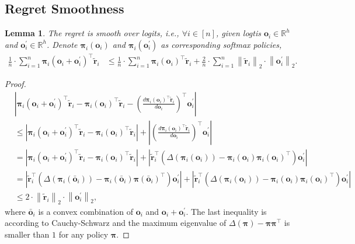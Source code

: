 \documentclass[10pt]{article}
\def\rvo{{\mathbf{o}}}
\def\rvo{{\mathbf{o}}}
\def\rvtilder{{\tilde{\mathbf{r}}}}
\newtheorem{lem}{Lemma}
\def\rvpi{{\boldsymbol{\pi}}}
\def\sR{{\mathbb{R}}}
\begin{document}
\subsection{Regret Smoothness}

\begin{lem}
    The regret is smooth over logits, i.e., $\forall i \in [n]$, given logtis $\rvo_i \in \sR^h$ and $\rvo_i^\prime \in \sR^h$. Denote $\rvpi_i(\rvo_i)$ and $\rvpi_i(\rvo_i^\prime)$ as corresponding softmax policies,
\begin{equation*}
\begin{split}
    \frac{1}{n} \cdot \sum\limits_{i=1}^{n}{  \rvpi_i(\rvo_i + \rvo_i^\prime)^\top \rvtilder_i } &\le \frac{1}{n} \cdot \sum\limits_{i=1}^{n}{ \rvpi_i(\rvo_i)^\top \rvtilder_i } + \frac{2}{n} \cdot \sum\limits_{i=1}^{n}{ \left\| \rvtilder_i \right\|_2 \cdot \left\| \rvo_i^\prime \right\|_2 }.
\end{split}
\end{equation*}
\end{lem}
\begin{proof}
\begin{equation*}
\begin{split}
    &\left| \rvpi_i(\rvo_i + \rvo_i^\prime)^\top \rvtilder_i  - \rvpi_i(\rvo_i)^\top \rvtilder_i - \left( \frac{d \rvpi_i(\rvo_i)^\top \rvtilder_i}{d \rvo_i} \right)^\top \rvo_i^\prime \right| \\
    &\le \left| \rvpi_i(\rvo_i + \rvo_i^\prime)^\top \rvtilder_i  - \rvpi_i(\rvo_i)^\top \rvtilder_i \right| + \left| \left( \frac{d \rvpi_i(\rvo_i)^\top \rvtilder_i}{d \rvo_i} \right)^\top \rvo_i^\prime \right| \\
    &= \left| \rvpi_i(\rvo_i + \rvo_i^\prime)^\top \rvtilder_i  - \rvpi_i(\rvo_i)^\top \rvtilder_i \right| + \left| \rvtilder_i^\top \left( \Delta\left( \rvpi_i(\rvo_i) \right)  - \rvpi_i(\rvo_i) \rvpi_i(\rvo_i)^\top \right) \rvo_i^\prime \right| \\
    &= \left| \rvtilder_i^\top \left( \Delta\left( \rvpi_i(\bar{\rvo}_i) \right)  - \rvpi_i(\bar{\rvo}_i) \rvpi(\bar{\rvo}_i)^\top \right) \rvo_i^\prime \right| + \left| \rvtilder_i^\top \left( \Delta\left( \rvpi_i(\rvo_i) \right)  - \rvpi_i(\rvo_i) \rvpi_i(\rvo_i)^\top \right) \rvo_i^\prime \right| \\
    &\le 2 \cdot \left\| \rvtilder_i \right\|_2 \cdot \left\| \rvo_i^\prime \right\|_2,
\end{split}
\end{equation*}
where $\bar{\rvo}_i$ is a convex combination of $\rvo_i$ and $\rvo_i + \rvo_i^\prime$. The last inequality is according to Cauchy-Schwarz and the maximum eigenvalue of $\Delta\left( \rvpi \right)  - \rvpi \rvpi^\top$ is smaller than $1$ for any policy $\rvpi$.
\end{proof}
\end{document}
